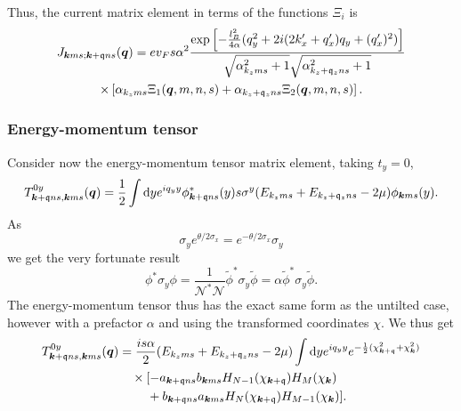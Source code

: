 Thus, the current matrix element in terms of  the functions \( \Xi_i \) is
\begin{multline}
  J_{\bm{k} m s; \bm{k} + \mathfrak{q} n s} (\bm{q}) =
  e v_F s \alpha^2
  \frac{
    \exp \left[
      -\frac{l_{B}^2}{4 \alpha } (q_{y}^2 + 2i (2 k' _x + q' _x) q_{y} + (q'_x)^2 )
    \right]
  }{
    \sqrt{\alpha_{k_z m s}^2 + 1} \sqrt{\alpha_{k_z + \mathfrak{q}_z n s}^2 + 1}
  }\\
 \times \left[
     \alpha_{k_z m s} \Xi_1(\bm{q}, m, n, s) + \alpha_{k_z + \mathfrak{q}_z n s} \Xi_2(\bm{q}, m, n, s)
  \right].
\end{multline}

\subsubsection{Energy-momentum tensor}
Consider now the energy-momentum tensor matrix element, taking \( t_y = 0 \),
\begin{equation}
  \label{eq:106}
  T_{\bm{k} + \mathfrak{q} n s, \bm{k} m s}^{0y} (\bm{q}) =
  \frac{1}{2}
  \int \mathrm{d} y
  e^{i q_{y} y}
  \phi ^{*}_{\bm{k} + \mathfrak{q} n s}(y) s \sigma ^{y}
  (E_{k_z m  s} + E_{k_z+\mathfrak{q}_z n s} - 2 \mu)
  \phi _{\bm{k} m s} (y).
\end{equation}
As
\begin{equation}
  \label{eq:107}
  \sigma _{y} e^{\theta /2 \sigma _{x}} = e^{-\theta /2 \sigma _{x}} \sigma _{y}
\end{equation}
we get the very fortunate result
\begin{equation}
  \label{eq:108}
  \phi^{*} \sigma _{y} \phi
  = \frac{1}{\mathcal{N}^{*} \mathcal{N}} \tilde{\phi}^{*} \sigma _{y} \tilde{\phi}
  = \alpha \tilde{\phi}^{*} \sigma _{y} \tilde{\phi}.
\end{equation}
The energy-momentum tensor thus has the exact same form as the untilted case, however with a prefactor \( \alpha \) and using the transformed coordinates \( \chi \).
We thus get
\begin{align}
  T_{\bm{k}+\mathfrak{q} ns, \bm{k} m s}^{0y} (\bm{q}) &=
  \frac{is \alpha}{2} (E_{k_z m s} + E_{k_z + \mathfrak{q}_z n s} - 2 \mu)
  \int \mathrm{d} y
  e^{i q_{y} y}
  e^{-\frac{1}{2} (\chi_{\bm{k}+\mathfrak{q}}^2 + \chi_{\bm{k}} ^2) }\nonumber\\
  &\quad \times [
  -a_{\bm{k} + \mathfrak{q} ns} b_{\bm{k} m s} H_{N-1} (\chi_{\bm{k} + \mathfrak{q}}) H_{M} (\chi_{\bm{k}})\nonumber\\
  & \qquad\; + b_{\bm{k} + \mathfrak{q} n s} a_{\bm{k} ms} H_{N}(\chi_{\bm{k} + \mathfrak{q}}) H_{M-1} (\chi_{\bm{k}})
  ].\label{eq:109}
\end{align}
